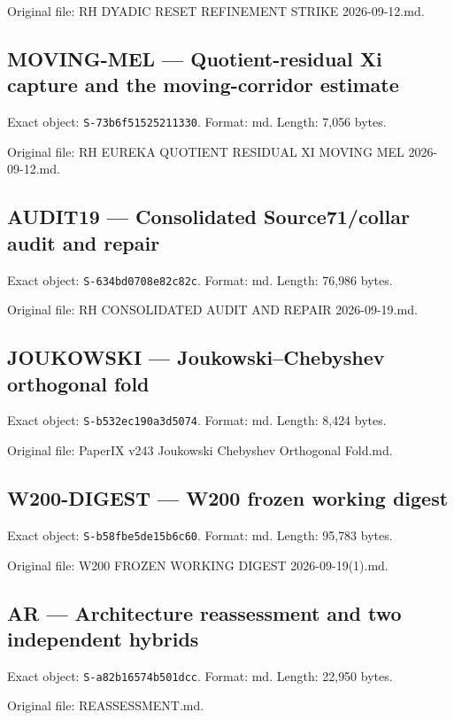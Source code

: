 \documentclass[
  10pt,
  a4paper,
  10pt,
  oneside,
  openany]{book}
\begin{document}
Original file: RH DYADIC RESET REFINEMENT STRIKE 2026-09-12.md.

\subsection{MOVING-MEL --- Quotient-residual Xi capture and the
moving-corridor estimate}\label{source-moving-mel}

Exact object: \texttt{S-73b6f51525211330}. Format: md. Length: 7,056
bytes.

Original file: RH EUREKA QUOTIENT RESIDUAL XI MOVING MEL 2026-09-12.md.

\subsection{AUDIT19 --- Consolidated Source71/collar audit and
repair}\label{source-audit19}

Exact object: \texttt{S-634bd0708e82c82c}. Format: md. Length: 76,986
bytes.

Original file: RH CONSOLIDATED AUDIT AND REPAIR 2026-09-19.md.

\subsection{JOUKOWSKI --- Joukowski--Chebyshev orthogonal
fold}\label{source-joukowski}

Exact object: \texttt{S-b532ec190a3d5074}. Format: md. Length: 8,424
bytes.

Original file: PaperIX v243 Joukowski Chebyshev Orthogonal Fold.md.

\subsection{W200-DIGEST --- W200 frozen working
digest}\label{source-w200-digest}

Exact object: \texttt{S-b58fbe5de15b6c60}. Format: md. Length: 95,783
bytes.

Original file: W200 FROZEN WORKING DIGEST 2026-09-19(1).md.

\subsection{AR --- Architecture reassessment and two independent
hybrids}\label{source-ar}

Exact object: \texttt{S-a82b16574b501dcc}. Format: md. Length: 22,950
bytes.

Original file: REASSESSMENT.md.
\end{document}
